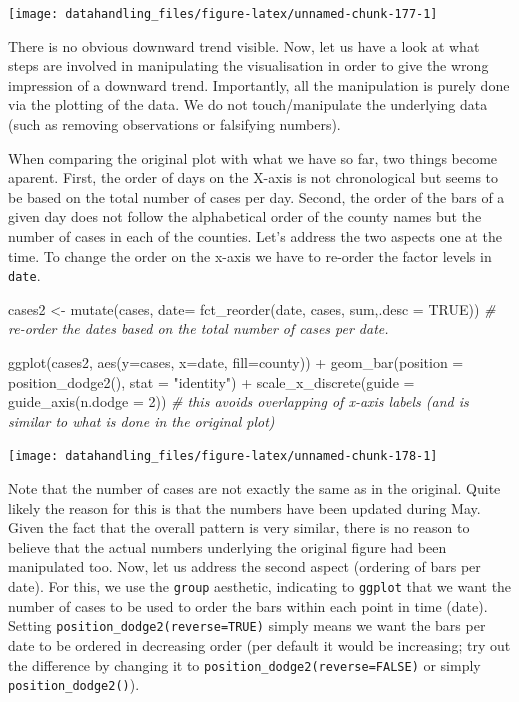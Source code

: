 \documentclass[
  12pt,
]{style/krantz}
\newenvironment{Shaded}{\begin{snugshade}}{\end{snugshade}}
\newcommand{\AttributeTok}[1]{\textcolor[rgb]{0.77,0.63,0.00}{#1}}
\newcommand{\CommentTok}[1]{\textcolor[rgb]{0.56,0.35,0.01}{\textit{#1}}}
\newcommand{\ConstantTok}[1]{\textcolor[rgb]{0.00,0.00,0.00}{#1}}
\newcommand{\DecValTok}[1]{\textcolor[rgb]{0.00,0.00,0.81}{#1}}
\newcommand{\FunctionTok}[1]{\textcolor[rgb]{0.00,0.00,0.00}{#1}}
\newcommand{\NormalTok}[1]{#1}
\newcommand{\OtherTok}[1]{\textcolor[rgb]{0.56,0.35,0.01}{#1}}
\newcommand{\SpecialCharTok}[1]{\textcolor[rgb]{0.00,0.00,0.00}{#1}}
\newcommand{\StringTok}[1]{\textcolor[rgb]{0.31,0.60,0.02}{#1}}
\begin{document}
\texttt{[image: datahandling\_files/figure-latex/unnamed-chunk-177-1]}

There is no obvious downward trend visible. Now, let us have a look at what steps are involved in manipulating the visualisation in order to give the wrong impression of a downward trend. Importantly, all the manipulation is purely done via the plotting of the data. We do not touch/manipulate the underlying data (such as removing observations or falsifying numbers).

When comparing the original plot with what we have so far, two things become aparent. First, the order of days on the X-axis is not chronological but seems to be based on the total number of cases per day. Second, the order of the bars of a given day does not follow the alphabetical order of the county names but the number of cases in each of the counties. Let's address the two aspects one at the time. To change the order on the x-axis we have to re-order the factor levels in \texttt{date}.

\begin{Shaded}
\begin{Highlighting}[]
\NormalTok{cases2 }\OtherTok{\textless{}{-}} \FunctionTok{mutate}\NormalTok{(cases, }\AttributeTok{date=} \FunctionTok{fct\_reorder}\NormalTok{(date, cases, sum,}\AttributeTok{.desc =} \ConstantTok{TRUE}\NormalTok{)) }\CommentTok{\# re{-}order the dates based on the total number of cases per date.}

\FunctionTok{ggplot}\NormalTok{(cases2, }\FunctionTok{aes}\NormalTok{(}\AttributeTok{y=}\NormalTok{cases, }\AttributeTok{x=}\NormalTok{date, }\AttributeTok{fill=}\NormalTok{county)) }\SpecialCharTok{+}
  \FunctionTok{geom\_bar}\NormalTok{(}\AttributeTok{position =} \FunctionTok{position\_dodge2}\NormalTok{(), }\AttributeTok{stat =} \StringTok{"identity"}\NormalTok{) }\SpecialCharTok{+} 
  \FunctionTok{scale\_x\_discrete}\NormalTok{(}\AttributeTok{guide =} \FunctionTok{guide\_axis}\NormalTok{(}\AttributeTok{n.dodge =} \DecValTok{2}\NormalTok{))  }\CommentTok{\# this avoids overlapping of x{-}axis labels (and is similar to what is done in the original plot)}
\end{Highlighting}
\end{Shaded}

\texttt{[image: datahandling\_files/figure-latex/unnamed-chunk-178-1]}

Note that the number of cases are not exactly the same as in the original. Quite likely the reason for this is that the numbers have been updated during May. Given the fact that the overall pattern is very similar, there is no reason to believe that the actual numbers underlying the original figure had been manipulated too. Now, let us address the second aspect (ordering of bars per date). For this, we use the \texttt{group} aesthetic, indicating to \texttt{ggplot} that we want the number of cases to be used to order the bars within each point in time (date). Setting \texttt{position\_dodge2(reverse=TRUE)} simply means we want the bars per date to be ordered in decreasing order (per default it would be increasing; try out the difference by changing it to \texttt{position\_dodge2(reverse=FALSE)} or simply \texttt{position\_dodge2()}).
\end{document}
